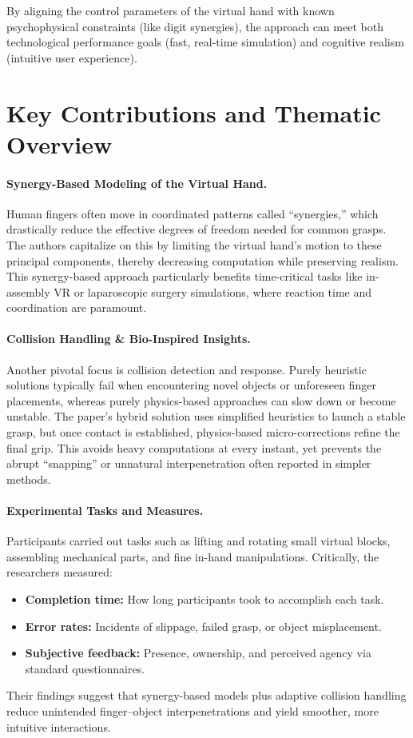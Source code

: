 \documentclass[11pt]{llncs}
\begin{document}
By aligning the control parameters of the virtual hand with known psychophysical constraints (like digit synergies), the approach can meet both technological performance goals (fast, real-time simulation) and cognitive realism (intuitive user experience).

\section*{Key Contributions and Thematic Overview}
\paragraph{Synergy-Based Modeling of the Virtual Hand.}
Human fingers often move in coordinated patterns called ``synergies,'' which drastically reduce the effective degrees of freedom needed for common grasps. The authors capitalize on this by limiting the virtual hand’s motion to these principal components, thereby decreasing computation while preserving realism. This synergy-based approach particularly benefits time-critical tasks like in-assembly VR or laparoscopic surgery simulations, where reaction time and coordination are paramount.

\paragraph{Collision Handling \& Bio-Inspired Insights.}
Another pivotal focus is collision detection and response. Purely heuristic solutions typically fail when encountering novel objects or unforeseen finger placements, whereas purely physics-based approaches can slow down or become unstable. The paper’s hybrid solution uses simplified heuristics to launch a stable grasp, but once contact is established, physics-based micro-corrections refine the final grip. This avoids heavy computations at every instant, yet prevents the abrupt ``snapping'' or unnatural interpenetration often reported in simpler methods.

\paragraph{Experimental Tasks and Measures.}
Participants carried out tasks such as lifting and rotating small virtual blocks, assembling mechanical parts, and fine in-hand manipulations. Critically, the researchers measured:
\begin{itemize}
    \item \textbf{Completion time:} How long participants took to accomplish each task.
    \item \textbf{Error rates:} Incidents of slippage, failed grasp, or object misplacement.
    \item \textbf{Subjective feedback:} Presence, ownership, and perceived agency via standard questionnaires.
\end{itemize}
Their findings suggest that synergy-based models plus adaptive collision handling reduce unintended finger--object interpenetrations and yield smoother, more intuitive interactions.
\end{document}
